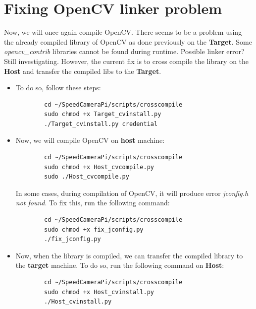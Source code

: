 \section{Fixing OpenCV linker problem}

Now, we will once again compile OpenCV. There seems to be a problem using the already compiled library of OpenCV as done previously on the \textbf{Target}. Some \textit{opencv\_contrib} libraries cannot be found during runtime. Possible linker error? Still investigating. However, the current fix is to cross compile the library on the \textbf{Host} and transfer the compiled libs to the \textbf{Target}.

\begin{itemize}
      \item To do
            so, follow these steps:

            \begin{lstlisting}
        cd ~/SpeedCameraPi/scripts/crosscompile
        sudo chmod +x Target_cvinstall.py
        ./Target_cvinstall.py credential
    \end{lstlisting}

      \item Now, we will compile OpenCV on \textbf{host} machine:

            \begin{lstlisting}
        cd ~/SpeedCameraPi/scripts/crosscompile
        sudo chmod +x Host_cvcompile.py
        sudo ./Host_cvcompile.py
    \end{lstlisting}

            In some cases, during compilation of OpenCV, it will produce error \textit{jconfig.h not found}. To fix this, run the following command:

            \begin{lstlisting}
        cd ~/SpeedCameraPi/scripts/crosscompile
        sudo chmod +x fix_jconfig.py
        ./fix_jconfig.py
    \end{lstlisting}

      \item Now, when the library is compiled, we can transfer the compiled library to the
            \textbf{target} machine. To do so, run the following command on \textbf{Host}:

            \begin{lstlisting}
        cd ~/SpeedCameraPi/scripts/crosscompile
        sudo chmod +x Host_cvinstall.py
        ./Host_cvinstall.py
    \end{lstlisting}

\end{itemize}

